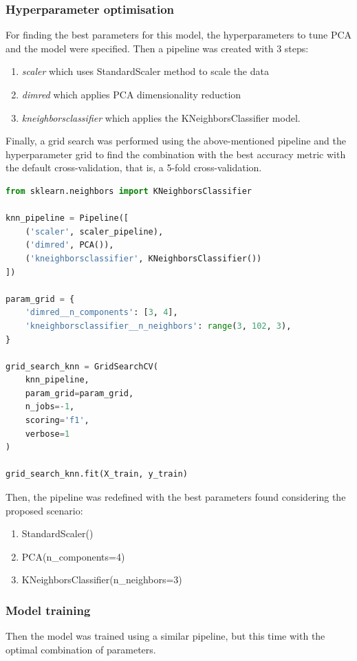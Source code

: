 \documentclass{article}
\begin{document}
\subsubsection{Hyperparameter optimisation}
For finding the best parameters for this model, the hyperparameters to tune PCA and the model were specified. Then a pipeline was created with 3 steps:
\begin{enumerate}
\item \emph{scaler} which uses StandardScaler method to scale the data
\item \emph{dimred} which applies PCA dimensionality reduction
\item \emph{kneighborsclassifier} which applies the KNeighborsClassifier model.
\end{enumerate}

Finally, a grid search was performed using the above-mentioned pipeline and the hyperparameter grid to find the combination with the best accuracy metric with the default cross-validation, that is, a 5-fold cross-validation.
\begin{lstlisting}[language=Python]
from sklearn.neighbors import KNeighborsClassifier

knn_pipeline = Pipeline([
    ('scaler', scaler_pipeline), 
    ('dimred', PCA()), 
    ('kneighborsclassifier', KNeighborsClassifier())
])

param_grid = {
    'dimred__n_components': [3, 4], 
    'kneighborsclassifier__n_neighbors': range(3, 102, 3),
}

grid_search_knn = GridSearchCV(
    knn_pipeline,
    param_grid=param_grid,
    n_jobs=-1,
    scoring='f1',
    verbose=1
)

grid_search_knn.fit(X_train, y_train)
\end{lstlisting}

Then, the pipeline was redefined with the best parameters found considering the proposed scenario:
\begin{enumerate}
    \item StandardScaler()
    \item PCA(n\_components=4)
    \item KNeighborsClassifier(n\_neighbors=3)
\end{enumerate}

\subsubsection{Model training}
Then the model was trained using a similar pipeline, but this time with the optimal combination of parameters.
\end{document}
